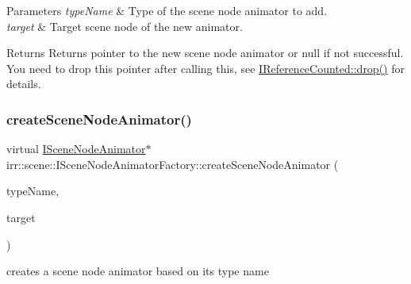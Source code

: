 \begin{DoxyParams}{Parameters}
{\em type\+Name} & Type of the scene node animator to add. \\
\hline
{\em target} & Target scene node of the new animator. \\
\hline
\end{DoxyParams}
\begin{DoxyReturn}{Returns}
Returns pointer to the new scene node animator or null if not successful. You need to drop this pointer after calling this, see \hyperlink{classirr_1_1IReferenceCounted_a03856a09355b89d178090c4a5f738543}{I\+Reference\+Counted\+::drop()} for details. 
\end{DoxyReturn}
\mbox{\label{classirr_1_1scene_1_1ISceneNodeAnimatorFactory_a093f1fb03d8e1c73ff60c8612b0ba778}} 
\subsubsection{\texorpdfstring{create\+Scene\+Node\+Animator()}{createSceneNodeAnimator()}\hspace{0.1cm}{\footnotesize\ttfamily [4/4]}}
{\footnotesize\ttfamily virtual \hyperlink{classirr_1_1scene_1_1ISceneNodeAnimator}{I\+Scene\+Node\+Animator}$\ast$ irr\+::scene\+::\+I\+Scene\+Node\+Animator\+Factory\+::create\+Scene\+Node\+Animator (\begin{DoxyParamCaption}\item[{const \hyperlink{namespaceirr_a9395eaea339bcb546b319e9c96bf7410}{c8} $\ast$}]{type\+Name,  }\item[{\hyperlink{classirr_1_1scene_1_1ISceneNode}{I\+Scene\+Node} $\ast$}]{target }\end{DoxyParamCaption})\hspace{0.3cm}{\ttfamily [pure virtual]}}



creates a scene node animator based on its type name 


